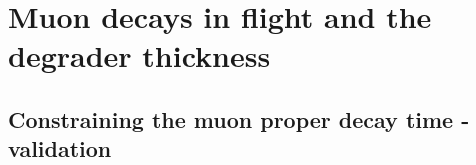 \section {Muon decays in flight and the degrader thickness}


\subsection {Constraining the muon proper decay time - validation}




